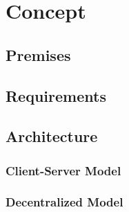 
\chapter{Concept}

\section{Premises}

\section{Requirements}

\section{Architecture}

\subsection{Client-Server Model}

\subsection{Decentralized Model}